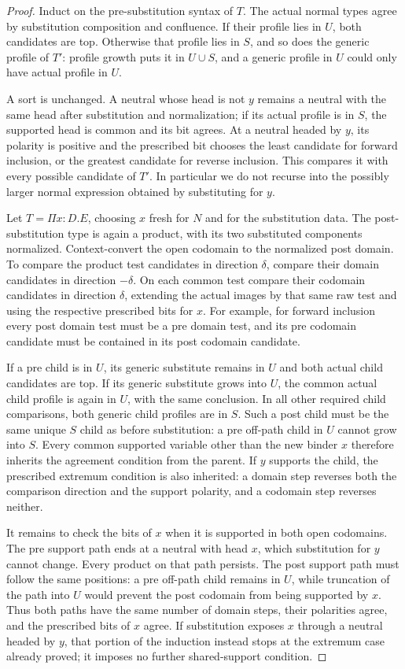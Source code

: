 \begin{proof}
Induct on the pre-substitution syntax of $T$. The actual normal
types agree by substitution composition and confluence. If their
profile lies in $U$, both candidates are top. Otherwise that profile
lies in $S$, and so does the generic profile of $T'$: profile growth
puts it in $U\cup S$, and a generic profile in $U$ could only have
actual profile in $U$.

A sort is unchanged. A neutral whose head is not $y$ remains a
neutral with the same head after substitution and normalization; if
its actual profile is in $S$, the supported head is common and its
bit agrees. At a neutral headed by $y$, its polarity is positive and
the prescribed bit chooses the least candidate for forward inclusion,
or the greatest candidate for reverse inclusion. This compares it
with every possible candidate of $T'$. In particular we do not
recurse into the possibly larger normal expression obtained by
substituting for $y$.

Let $T=\Pi x:D.E$, choosing $x$ fresh for $N$ and for the
substitution data. The post-substitution type is again a product,
with its two substituted components normalized. Context-convert the
open codomain to the normalized post domain. To compare the product
test candidates in direction $\delta$, compare their domain
candidates in direction $-\delta$. On each common test compare their
codomain candidates in direction $\delta$, extending the actual
images by that same raw test and using the respective prescribed
bits for $x$. For example, for forward inclusion every post domain
test must be a pre domain test, and its pre codomain candidate must
be contained in its post codomain candidate.

If a pre child is in $U$, its generic substitute remains in $U$ and
both actual child candidates are top. If its generic substitute
grows into $U$, the common actual child profile is again in $U$,
with the same conclusion. In all other required child comparisons,
both generic child profiles are in $S$. Such a post child must be
the same unique $S$ child as before substitution: a pre off-path
child in $U$ cannot grow into $S$. Every common supported variable
other than the new binder $x$ therefore inherits the agreement
condition from the parent. If $y$ supports the child, the prescribed
extremum condition is also inherited: a domain step reverses both
the comparison direction and the support polarity, and a codomain
step reverses neither.

It remains to check the bits of $x$ when it is supported in both
open codomains. The pre support path ends at a neutral with head
$x$, which substitution for $y$ cannot change. Every product on
that path persists. The post support path must follow the same
positions: a pre off-path child remains in $U$, while truncation
of the path into $U$ would prevent the post codomain from being
supported by $x$. Thus both paths have the same number of domain
steps, their polarities agree, and the prescribed bits of $x$
agree. If substitution exposes $x$ through a neutral headed by
$y$, that portion of the induction instead stops at the extremum
case already proved; it imposes no further shared-support condition.


\end{proof}
